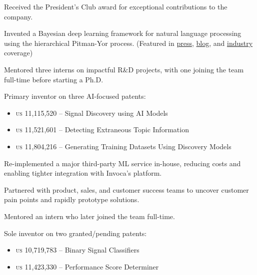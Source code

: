 
\begin{innerlist}
\item Received the President's Club award for exceptional contributions to the company.
\item Invented a Bayesian deep learning framework for natural language processing using the hierarchical Pitman-Yor process. (Featured in \href{https://www.invoca.com/press-release/invoca-releases-signal-discovery-to-give-marketers-access-to-an-untapped-source-of-first-party-customer-data}{press}, \href{https://www.invoca.com/press-release/invoca-releases-signal-discovery-to-give-marketers-access-to-an-untapped-source-of-first-party-customer-data}{blog}, and \href{https://opusresearch.net/2019/10/24/invoca-pushes-signal-discovery-for-analyzing-customer-conversations/}{industry} coverage)
\item Mentored three interns on impactful R\&D projects, with one joining the team full-time before starting a Ph.D.
\item Primary inventor on three AI-focused patents:
  \begin{itemize}
    \item \textsc{\MakeTextLowercase{US 11,115,520}} – Signal Discovery using AI Models
    \item \textsc{\MakeTextLowercase{US 11,521,601}} – Detecting Extraneous Topic Information
    \item \textsc{\MakeTextLowercase{US 11,804,216}} – Generating Training Datasets Using Discovery Models
  \end{itemize}
\end{innerlist}



\begin{innerlist}
\item Re-implemented a major third-party ML service in-house, reducing costs and enabling tighter integration with Invoca's platform.
\item Partnered with product, sales, and customer success teams to uncover customer pain points and rapidly prototype solutions.
\item Mentored an intern who later joined the team full-time.
\item Sole inventor on two granted/pending patents:
  \begin{itemize}
    \item \textsc{\MakeTextLowercase{US 10,719,783}} – Binary Signal Classifiers
    \item \textsc{\MakeTextLowercase{US 11,423,330}} – Performance Score Determiner
  \end{itemize}
\end{innerlist}
